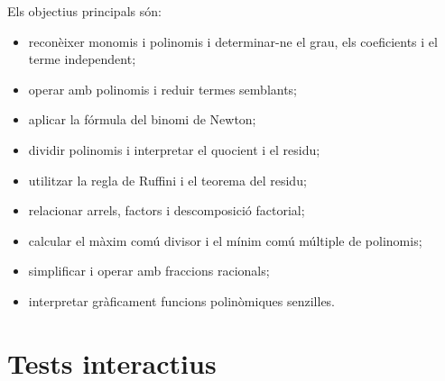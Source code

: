 \documentclass[12pt,a4paper,oneside]{book}
\begin{document}
Els objectius principals són:
\begin{itemize}
\item reconèixer monomis i polinomis i determinar-ne el grau, els coeficients i el terme independent;
\item operar amb polinomis i reduir termes semblants;
\item aplicar la fórmula del binomi de Newton;
\item dividir polinomis i interpretar el quocient i el residu;
\item utilitzar la regla de Ruffini i el teorema del residu;
\item relacionar arrels, factors i descomposició factorial;
\item calcular el màxim comú divisor i el mínim comú múltiple de polinomis;
\item simplificar i operar amb fraccions racionals;
\item interpretar gràficament funcions polinòmiques senzilles.
\end{itemize}

\let\cleardoublepage\clearpage
\mainmatter





\chapter{Tests interactius}
\label{cap:tests}

\begin{Form}
\end{Form}

\backmatter
\end{document}
